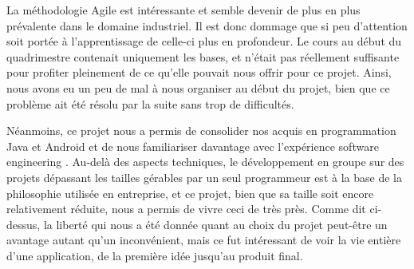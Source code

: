 \documentclass{elsarticle}
\begin{document}
La méthodologie Agile est intéressante et semble devenir de plus en plus prévalente dans le domaine industriel.
Il est donc dommage que si peu d'attention soit portée à l'apprentissage de celle-ci plus en profondeur.
Le cours au début du quadrimestre contenait uniquement les bases, et n'était pas réellement suffisante pour profiter pleinement de ce qu'elle pouvait nous offrir pour ce projet.
Ainsi, nous avons eu un peu de mal à nous organiser au début du projet, bien que ce problème ait été résolu par la suite sans trop de difficultés.

Néanmoins, ce projet nous a permis de consolider nos acquis en programmation Java et Android et de nous familiariser davantage avec l'expérience \og software engineering \fg.
Au-delà des aspects techniques, le développement en groupe sur des projets dépassant les tailles gérables par un seul programmeur est à la base de la philosophie utilisée en entreprise, et ce projet, bien que sa taille soit encore relativement réduite, nous a permis de vivre ceci de très près.
Comme dit ci-dessus, la liberté qui nous a été donnée quant au choix du projet peut-être un avantage autant qu'un inconvénient, mais ce fut intéressant de voir la vie entière d'une application, de la première idée jusqu'au produit final.


\end{document}
